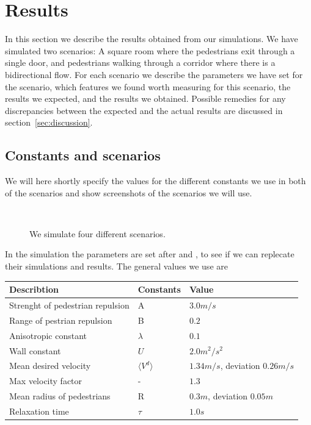 \section{Results}
\label{sec:results}
In this section we describe the results obtained from our simulations. We have simulated two scenarios: A square room where the pedestrians exit through a single door, and pedestrians walking through a corridor where there is a bidirectional flow. For each scenario we describe the parameters we have set for the scenario, which features we found worth measuring for this scenario, the results we expected, and the results we obtained. Possible remedies for any discrepancies between the expected and the actual results are discussed in section~\ref{sec:discussion}.

\subsection{Constants and scenarios}
We will here shortly specify the values for the different constants we use in both of the scenarios and show screenshots of the scenarios we will use.

\begin{figure}[h]
\centering
\subfloat[]{}
\subfloat[]{}\\
\subfloat[]{}
\subfloat[]{}
\caption{We simulate four different scenarios.}
\label{fig:fourcases}
\end{figure}

In the simulation the parameters are set after \cite{ABconstant} and \cite{self-org}, to see if we can replecate their simulations and results. The general values we use are

\begin{center}
\begin{table}[ht]
\begin{center}
    \begin{tabular}{ | l | l | l |}
    \hline
       Describtion & Constants & Value \\ \hline \hline
	Strenght of pedestrian repulsion & A & $3.0m/s$ \\ \hline	
	Range of pestrian repulsion & B & $0.2$ \\ \hline
	Anisotropic constant & $\lambda$ & $0.1$ \\ \hline
	Wall constant & $U$ &  $2.0m^2/s^2$ \\ \hline
	Mean desired velocity &  $\langle V^d \rangle$ &  $1.34 m/s$, deviation $0.26 m/s$ \\ \hline
	Max velocity factor & - &  $1.3$ \\ \hline
	Mean radius of pedestrians & R & $0.3 m$, deviation $0.05 m$\\ \hline
	Relaxation time & $\tau$ & $1.0 s$\\ \hline
    \end{tabular}
\label{Table_constants}
\end{center}
\end{table}
\end{center}

